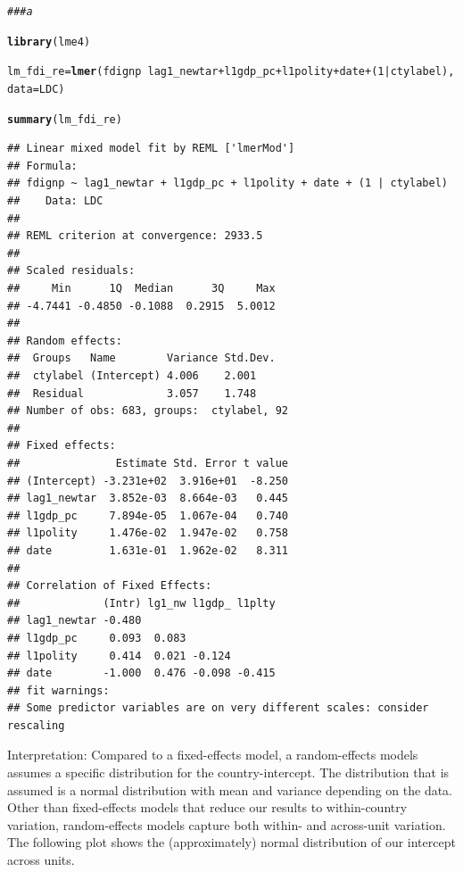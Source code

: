 \documentclass[12pt]{article}\usepackage[]{graphicx}\usepackage[]{color}
\makeatletter
\newcommand{\hlnum}[1]{\textcolor[rgb]{0.686,0.059,0.569}{#1}}%
\newcommand{\hlcom}[1]{\textcolor[rgb]{0.678,0.584,0.686}{\textit{#1}}}%
\newcommand{\hlopt}[1]{\textcolor[rgb]{0,0,0}{#1}}%
\newcommand{\hlstd}[1]{\textcolor[rgb]{0.345,0.345,0.345}{#1}}%
\newcommand{\hlkwb}[1]{\textcolor[rgb]{0.69,0.353,0.396}{#1}}%
\newcommand{\hlkwc}[1]{\textcolor[rgb]{0.333,0.667,0.333}{#1}}%
\newcommand{\hlkwd}[1]{\textcolor[rgb]{0.737,0.353,0.396}{\textbf{#1}}}%
\newenvironment{kframe}{%
 \def\at@end@of@kframe{}%
 \ifinner\ifhmode%
  \def\at@end@of@kframe{\end{minipage}}%
  \begin{minipage}{\columnwidth}%
 \fi\fi%
 \def\FrameCommand##1{\hskip\@totalleftmargin \hskip-\fboxsep
 \colorbox{shadecolor}{##1}\hskip-\fboxsep
     \hskip-\linewidth \hskip-\@totalleftmargin \hskip\columnwidth}%
 \MakeFramed {\advance\hsize-\width
   \@totalleftmargin\z@ \linewidth\hsize
   \@setminipage}}%
 {\par\unskip\endMakeFramed%
 \at@end@of@kframe}
\newenvironment{knitrout}{}{} %
\makeatother
\begin{document}
\begin{knitrout}
\color{fgcolor}\begin{kframe}
\begin{alltt}
\hlcom{### a}

\hlkwd{library}\hlstd{(lme4)}
\end{alltt}


{\ttfamily\noindent\itshape\color{messagecolor}{\#\# Loading required package: Matrix}}\begin{alltt}
\hlstd{lm_fdi_re} \hlkwb{=} \hlkwd{lmer}\hlstd{(fdignp} \hlopt{~} \hlstd{lag1_newtar} \hlopt{+} \hlstd{l1gdp_pc} \hlopt{+} \hlstd{l1polity} \hlopt{+} \hlstd{date} \hlopt{+} \hlstd{(}\hlnum{1} \hlopt{|} \hlstd{ctylabel),}
    \hlkwc{data} \hlstd{= LDC)}
\end{alltt}


{\ttfamily\noindent\color{warningcolor}{\#\# Warning: Some predictor variables are on very different scales: consider rescaling}}\begin{alltt}
\hlkwd{summary}\hlstd{(lm_fdi_re)}
\end{alltt}
\begin{verbatim}
## Linear mixed model fit by REML ['lmerMod']
## Formula: 
## fdignp ~ lag1_newtar + l1gdp_pc + l1polity + date + (1 | ctylabel)
##    Data: LDC
## 
## REML criterion at convergence: 2933.5
## 
## Scaled residuals: 
##     Min      1Q  Median      3Q     Max 
## -4.7441 -0.4850 -0.1088  0.2915  5.0012 
## 
## Random effects:
##  Groups   Name        Variance Std.Dev.
##  ctylabel (Intercept) 4.006    2.001   
##  Residual             3.057    1.748   
## Number of obs: 683, groups:  ctylabel, 92
## 
## Fixed effects:
##               Estimate Std. Error t value
## (Intercept) -3.231e+02  3.916e+01  -8.250
## lag1_newtar  3.852e-03  8.664e-03   0.445
## l1gdp_pc     7.894e-05  1.067e-04   0.740
## l1polity     1.476e-02  1.947e-02   0.758
## date         1.631e-01  1.962e-02   8.311
## 
## Correlation of Fixed Effects:
##             (Intr) lg1_nw l1gdp_ l1plty
## lag1_newtar -0.480                     
## l1gdp_pc     0.093  0.083              
## l1polity     0.414  0.021 -0.124       
## date        -1.000  0.476 -0.098 -0.415
## fit warnings:
## Some predictor variables are on very different scales: consider rescaling
\end{verbatim}
\end{kframe}
\end{knitrout}

Interpretation: Compared to a fixed-effects model, a random-effects models assumes a specific distribution for the country-intercept. The distribution that is assumed is a normal distribution with mean and variance depending on the data. Other than fixed-effects models that reduce our results to within-country variation, random-effects models capture both within- and across-unit variation. The following plot shows the (approximately) normal distribution of our intercept across units.
\end{document}

